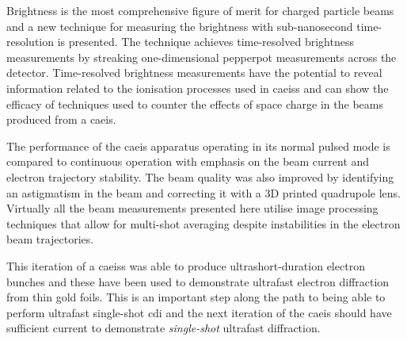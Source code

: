 Brightness is the most comprehensive figure of merit for charged particle beams and a new technique for measuring the brightness with sub-nanosecond time-resolution is presented.
The technique achieves time-resolved brightness measurements by streaking one-dimensional pepperpot measurements across the detector.
Time-resolved brightness measurements have the potential to reveal information related to the ionisation processes used in \glspl{caeis} and can show the efficacy of techniques used to counter the effects of space charge in the beams produced from a \gls{caeis}.

The performance of the \gls{caeis} apparatus operating in its normal pulsed mode is compared to continuous operation with emphasis on the beam current and electron trajectory stability.
The beam quality was also improved by identifying an astigmatism in the beam and correcting it with a 3D printed quadrupole lens.
Virtually all the beam measurements presented here utilise image processing techniques that allow for multi-shot averaging despite instabilities in the electron beam trajectories.

This iteration of a \glspl{caeis} was able to produce ultrashort-duration electron bunches and these have been used to demonstrate ultrafast electron diffraction from thin gold foils.
This is an important step along the path to being able to perform ultrafast single-shot \gls{cdi} and the next iteration of the \gls{caeis} should have sufficient current to demonstrate \emph{single-shot} ultrafast diffraction.